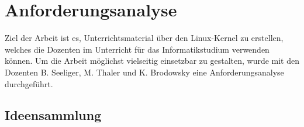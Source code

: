 \section{Anforderungsanalyse}
\label{sec:requirement_anaylse}

Ziel der Arbeit ist es, Unterrichtsmaterial über den Linux-Kernel zu erstellen, welches die Dozenten im Unterricht
für das Informatikstudium verwenden können. Um die Arbeit möglichst vielseitig einsetzbar zu gestalten,
wurde mit den Dozenten B. Seeliger, M. Thaler und K. Brodowsky eine Anforderungsanalyse durchgeführt.

\subsection{Ideensammlung}
\label{subsec:freq}

